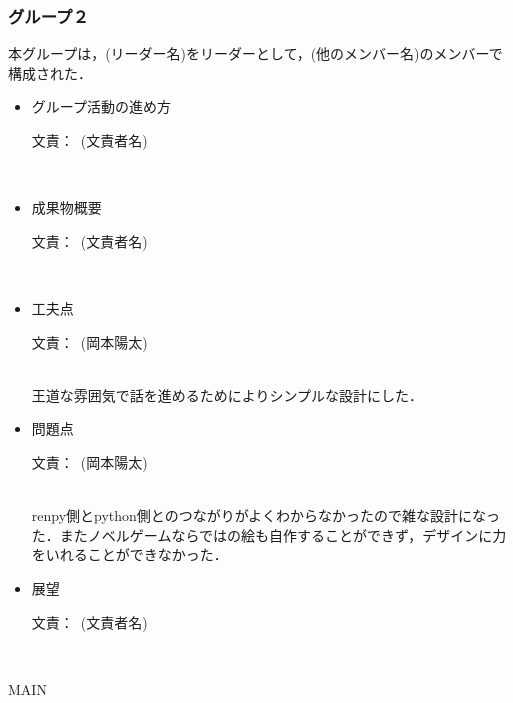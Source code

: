 \documentclass[a4paper]{jarticle}
\newcommand{\resp}[1]{\begin{flushright}文責：~#1\end{flushright}~\\}
\begin{document}
\fi

\subsubsection{グループ２}
    
    本グループは，(リーダー名)をリーダーとして，(他のメンバー名)のメンバーで構成された．

    \begin{itemize}
        \item グループ活動の進め方
        
        \resp{(文責者名)}


        \item 成果物概要
        
        \resp{(文責者名)}


        \item 工夫点
        
        \resp{(岡本陽太)}

        王道な雰囲気で話を進めるためによりシンプルな設計にした．

        \item 問題点
        
        \resp{(岡本陽太)}

        renpy側とpython側とのつながりがよくわからなかったので雑な設計になった．またノベルゲームならではの絵も自作することができず，デザインに力をいれることができなかった．

        \item 展望
        
        \resp{(文責者名)}


    \end{itemize}

\expandafter\ifx\csname MAIN \endcsname\relax
  
\end{document}
